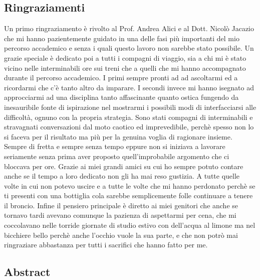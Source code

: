 \documentclass[12pt,a4paper]{book}
\begin{document}
	\newpage
	
	\subsection*{Ringraziamenti}
	Un primo ringraziamento è rivolto al Prof. Andrea Alici e al Dott. Nicolò Jacazio che mi hanno pazientemente guidato in una delle fasi più importanti del mio percorso accademico e senza i quali questo lavoro non sarebbe stato possibile. Un grazie speciale è dedicato poi a tutti i compagni di viaggio, sia a chi mi è stato vicino nelle interminabili ore sui treni che a quelli che mi hanno accompagnato durante il percorso accademico. I primi sempre pronti ad ad ascoltarmi ed a ricordarmi che c'è tanto altro da imparare. I secondi invece mi hanno isegnato ad approcciarmi ad una disciplina tanto affascinante quanto ostica fungendo da inesauribile fonte di ispirazione nel mostrarmi i possibili modi di interfacciarsi alle difficoltà, ognuno con la propria strategia. Sono stati compagni di interminabili e stravagnati conversazioni dal moto caotico ed imprevedibile, perchè spesso non lo si faceva per il risultato ma più per la genuina voglia di ragionare insieme. Sempre di fretta e sempre senza tempo eppure non si iniziava a lavorare seriamente senza prima aver proposto quell'improbabile argomento che ci bloccava per ore. Grazie ai miei grandi amici su cui ho sempre potuto contare anche se il tempo a loro dedicato non gli ha mai reso gustizia. A tutte quelle volte in cui non potevo uscire e a tutte le volte che mi hanno perdonato perchè se ti presenti con una bottiglia cola sarebbe semplicemente folle continuare a tenere il broncio. Infine il pensiero principale è diretto ai miei genitori che anche se tornavo tardi avevano comunque la pazienza di aspettarmi per cena, che mi coccolavano nelle torride giornate di studio estivo con dell'acqua al limone ma nel bicchiere bello perchè anche l'occhio vuole la sua parte, e che non potrò mai ringraziare abbastanza per tutti i sacrifici che hanno fatto per me. %
	
	\newpage
	\subsection*{Abstract}
	
\end{document}
